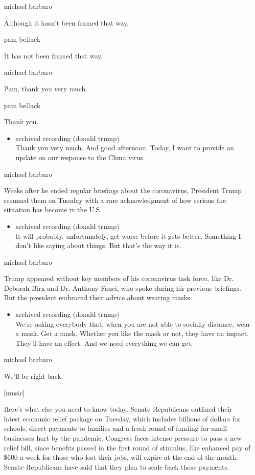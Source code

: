 michael barbaro

Although it hasn't been framed that way.

pam belluck

It has not been framed that way.

michael barbaro

Pam, thank you very much.

pam belluck

Thank you.

\begin{itemize}
\tightlist
\item
  archived recording (donald trump)\\
  Thank you very much. And good afternoon. Today, I want to provide an
  update on our response to the China virus.
\end{itemize}

michael barbaro

Weeks after he ended regular briefings about the coronavirus, President
Trump resumed them on Tuesday with a rare acknowledgment of how serious
the situation has become in the U.S.

\begin{itemize}
\tightlist
\item
  archived recording (donald trump)\\
  It will probably, unfortunately, get worse before it gets better.
  Something I don't like saying about things. But that's the way it is.
\end{itemize}

michael barbaro

Trump appeared without key members of his coronavirus task force, like
Dr. Deborah Birx and Dr. Anthony Fauci, who spoke during his previous
briefings. But the president embraced their advice about wearing masks.

\begin{itemize}
\tightlist
\item
  archived recording (donald trump)\\
  We're asking everybody that, when you are not able to socially
  distance, wear a mask. Get a mask. Whether you like the mask or not,
  they have an impact. They'll have an effect. And we need everything we
  can get.
\end{itemize}

michael barbaro

We'll be right back.

{[}music{]}

Here's what else you need to know today. Senate Republicans outlined
their latest economic relief package on Tuesday, which includes billions
of dollars for schools, direct payments to families and a fresh round of
funding for small businesses hurt by the pandemic. Congress faces
intense pressure to pass a new relief bill, since benefits passed in the
first round of stimulus, like enhanced pay of \$600 a week for those who
lost their jobs, will expire at the end of the month. Senate Republicans
have said that they plan to scale back those payments.


